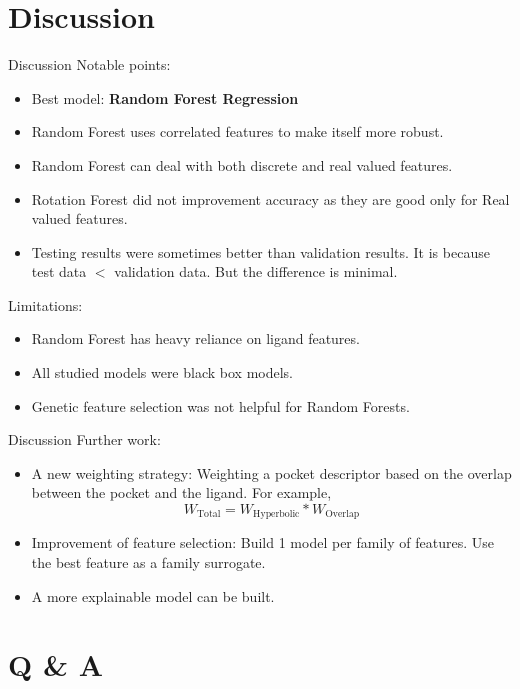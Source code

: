 \documentclass{beamer}
\begin{document}
\section{Discussion}
\begin{frame}[t]{Discussion}
Notable points:
\begin{itemize}
\item Best model: \textbf{Random Forest Regression}
\item Random Forest uses correlated features to make itself more robust.
\item Random Forest can deal with both discrete and real valued features.
\item Rotation Forest did not improvement accuracy as they are good only for Real valued features.
\item Testing results were sometimes better than validation results. It is because test data $<$ validation data.
But the difference is minimal.
\end{itemize} 
Limitations:
\begin{itemize}
\item Random Forest has heavy reliance on ligand features.
\item All studied models were black box models.
\item Genetic feature selection was not helpful for Random Forests.

\end{itemize} 
\end{frame}

\begin{frame}[t]{Discussion}
Further work:
\begin{itemize}
\item A new weighting strategy: Weighting a pocket descriptor based on the overlap between the pocket and the ligand.  For example,
$$
W_\mathrm{Total} = W_\mathrm{Hyperbolic} * W_\mathrm{Overlap}
$$
\item Improvement of feature selection: Build 1 model per family of features. Use the best feature as a family surrogate.
\item A more explainable model can be built.
\end{itemize} 

\end{frame}

\section{Q \& A}
\end{document}

